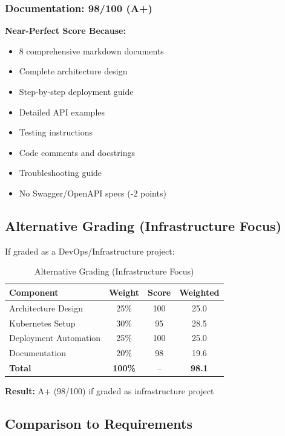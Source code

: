 \documentclass[12pt,a4paper]{article}
\begin{document}
\subsubsection{Documentation: 98/100 (A+)}
\textbf{Near-Perfect Score Because:}
\begin{itemize}[itemsep=0pt]
    \item[+] 8 comprehensive markdown documents
    \item[+] Complete architecture design
    \item[+] Step-by-step deployment guide
    \item[+] Detailed API examples
    \item[+] Testing instructions
    \item[+] Code comments and docstrings
    \item[+] Troubleshooting guide
    \item[-] No Swagger/OpenAPI specs (-2 points)
\end{itemize}

\subsection{Alternative Grading (Infrastructure Focus)}

If graded as a DevOps/Infrastructure project:

\begin{table}[h]
\centering
\begin{tabular}{@{}lccc@{}}
\toprule
\textbf{Component} & \textbf{Weight} & \textbf{Score} & \textbf{Weighted} \\
\midrule
Architecture Design & 25\% & 100 & 25.0 \\
Kubernetes Setup & 30\% & 95 & 28.5 \\
Deployment Automation & 25\% & 100 & 25.0 \\
Documentation & 20\% & 98 & 19.6 \\
\midrule
\textbf{Total} & \textbf{100\%} & -- & \textbf{98.1} \\
\bottomrule
\end{tabular}
\caption{Alternative Grading (Infrastructure Focus)}
\end{table}

\textbf{Result:} A+ (98/100) if graded as infrastructure project

\subsection{Comparison to Requirements}
\end{document}
